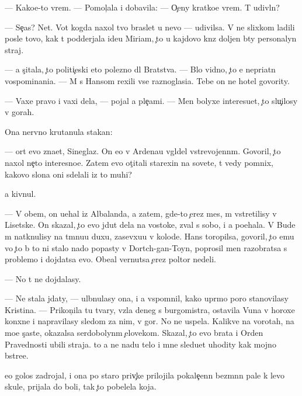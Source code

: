 \documentclass[10pt]{book}
\begin{document}
— Kako{\y}e-to vrem{\ia}. — Pomol{\c}ala i dobavila: — O{\c}eny kratko{\y}e vrem{\ia}. T{\yi} udivl{\e}n?

— Se{\y}{\c}as? Net. Vot kogda naxol tvo{\y} braslet u nevo — udivilsa. V{\yi} ne slixkom ladili posle tovo, kak t{\yi} podderjala ide{\y}u Miriam, {\c}to u kajdovo kn{\ia}z{\ia} doljen b{\yi}ty personalyn{\yi}{\y} straj.

— {\Y}a s{\c}itala, {\c}to politi{\c}eski eto polezno dl{\ia} Bratstva. — B{\yi}lo vidno, {\c}to {\y}e{\y} nepri{\y}atn{\yi} vospominani{\y}a. — M{\yi} s Hansom rexili vse raznoglasi{\y}a. Tebe on ne hotel govority.

— Vaxe pravo i vaxi dela, — pojal {\y}a ple{\c}ami. — Men{\ia} bolyxe interesu{\y}et, {\c}to slu{\c}ilosy v gorah.

Ona nervno krutanula stakan:

— {\C}ort {\y}evo zna{\y}et, Sineglaz{\yi}{\y}. On {\y}e{\x}o v Ardenau v{\yi}gl{\ia}del vstrevojenn{\yi}m. Govoril, {\c}to naxol ne{\c}to interesno{\y}e. Zatem {\y}evo ot{\c}itali stare{\y}xin{\yi} na sovete, t{\yi} vedy pomnix, kakovo slona oni sdelali iz to{\y} muhi?

{\Y}a kivnul.

— V ob{\x}em, on u{\y}ehal iz Albalanda, a zatem, gde-to {\c}erez mes{\ia}{\q}, m{\yi} vstretilisy v Lisetske. On skazal, {\c}to {\y}evo jdut dela na vostoke, zval s sobo{\y}, i {\y}a po{\y}ehala. V Bude m{\yi} natknulisy na t{\e}mnu{\y}u duxu, zasevxu{\y}u v kolod{\q}e. Hans toropilsa, govoril, {\c}to {\y}emu vo {\c}to b{\yi} to ni stalo nado popasty v Dortch-gan-Toyn, poprosil men{\ia} razobratsa s problemo{\y} i dojdatsa {\y}evo. Obe{\x}al vernutsa {\c}erez poltor{\yi} nedeli.

— No t{\yi} ne dojdalasy.

— Ne stala jdaty, — ul{\yi}bnulasy ona, i {\y}a vspomnil, kako{\y} upr{\ia}mo{\y} poro{\y} stanovilasy Kristina. — Prikon{\c}ila tu tvary, vz{\ia}la deneg s burgomistra, ostavila V{\y}una v horoxe{\y} kon{\iu}xne i napravilasy sledom za nim, v gor{\yi}. No ne uspela. Kalikve{\q} na vorotah, na mo{\y}e s{\c}ast{\y}e, okazalsa serdobolyn{\yi}m {\c}elovekom. Skazal, {\c}to {\y}evo brat{\y}a i Orden Pravednosti ubili straja. {\C}to {\y}a ne na{\y}du telo i mne sledu{\y}et uhodity kak mojno b{\yi}stre{\y}e.

{\Y}e{\y}o golos zadrojal, i ona po staro{\y} priv{\yi}{\c}ke prilojila pokale{\c}enn{\yi}{\y} bez{\yi}m{\ia}nn{\yi}{\y} pale{\q} k levo{\y} skule, prijala do boli, tak {\c}to pobelela koja.
\end{document}
